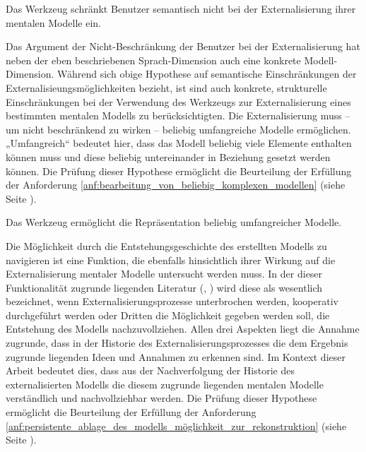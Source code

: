 \begin{hyp}
	\label{hyp:keine_einschränkung}
	Das Werkzeug schränkt Benutzer semantisch nicht bei der Externalisierung ihrer mentalen Modelle ein.
\end{hyp}

Das Argument der Nicht-Beschränkung der Benutzer bei der Externalisierung hat neben der eben beschriebenen Sprach-Dimension auch eine konkrete Modell-Dimension. Während sich obige Hypothese auf semantische Einschränkungen der Externalisieungsmöglichkeiten bezieht, ist sind auch konkrete, strukturelle Einschränkungen bei der Verwendung des Werkzeugs zur Externalisierung eines bestimmten mentalen Modells zu berücksichtigten. Die Externalisierung muss -- um nicht beschränkend zu wirken -- beliebig umfangreiche Modelle ermöglichen. „Umfangreich“ bedeutet hier, dass das Modell beliebig viele Elemente enthalten können muss und diese beliebig untereinander in Beziehung gesetzt werden können. Die Prüfung dieser Hypothese ermöglicht die Beurteilung der Erfüllung der Anforderung \ref{anf:bearbeitung_von_beliebig_komplexen_modellen} (siehe Seite \pageref{anf:bearbeitung_von_beliebig_komplexen_modellen}).
	
\begin{hyp}
	\label{hyp:beliebige_komplexität}
	Das Werkzeug ermöglicht die Repräsentation beliebig umfangreicher Modelle.
\end{hyp}

Die Möglichkeit durch die Entstehungsgeschichte des erstellten Modells zu navigieren ist eine Funktion, die ebenfalls hinsichtlich ihrer Wirkung auf die Externalisierung mentaler Modelle untersucht werden muss. In der dieser Funktionalität zugrunde liegenden Literatur (\citep{Shipman00}, \citep{Klemmer02}) wird diese als wesentlich bezeichnet, wenn Externalisierungsprozesse unterbrochen werden, kooperativ durchgeführt werden oder Dritten die Möglichkeit gegeben werden soll, die Entstehung des Modells nachzuvollziehen. Allen drei Aspekten liegt die Annahme zugrunde, dass in der Historie des Externalisierungsprozesses die dem Ergebnis zugrunde liegenden Ideen und Annahmen zu erkennen sind. Im Kontext dieser Arbeit bedeutet dies, dass aus der Nachverfolgung der Historie des externalisierten Modells die diesem zugrunde liegenden mentalen Modelle verständlich und nachvollziehbar werden. Die Prüfung dieser Hypothese ermöglicht die Beurteilung der Erfüllung der Anforderung \ref{anf:persistente_ablage_des_modells_möglichkeit_zur_rekonstruktion} (siehe Seite \pageref{anf:persistente_ablage_des_modells_möglichkeit_zur_rekonstruktion}).

